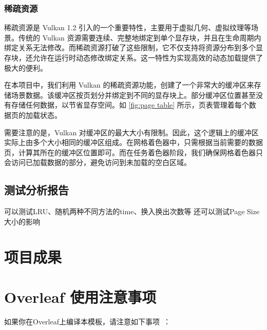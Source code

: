 \subsubsection{稀疏资源}

稀疏资源是 Vulkan 1.2 引入的一个重要特性，主要用于虚拟几何、虚拟纹理等场景。传统的 Vulkan 资源需要连续、完整地绑定到单个显存块，并且在生命周期内绑定关系无法修改。而稀疏资源打破了这些限制，它不仅支持将资源分布到多个显存块，还允许在运行时动态修改绑定关系。这一特性为实现高效的动态加载提供了极大的便利。

在本项目中，我们利用 Vulkan 的稀疏资源功能，创建了一个非常大的缓冲区来存储场景数据。该缓冲区按页划分并绑定到不同的显存块上。部分缓冲区位置甚至没有存储任何数据，以节省显存空间。如 \autoref{fig:page table} 所示，页表管理着每个数据页的加载状态。

需要注意的是，Vulkan 对缓冲区的最大大小有限制。因此，这个逻辑上的缓冲区实际上由多个大小相同的缓冲区组成。在网格着色器中，只需根据当前需要的数据页，计算其所在的缓冲区位置即可。而在任务着色器阶段，我们确保网格着色器只会访问已加载数据的部分，避免访问到未加载的空白区域。

\subsection{测试分析报告} \label{subsec:streaming test}

可以测试LRU、随机两种不同方法的time、换入换出次数等
还可以测试Page Size大小的影响

\section{项目成果}

\section{Overleaf 使用注意事项}

如果你在Overleaf上编译本模板，请注意如下事项~\cite{zjuthesis}：